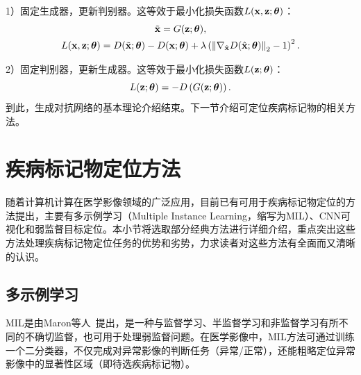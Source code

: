 1）固定生成器，更新判别器。这等效于最小化损失函数$L(\mathbf{x},\mathbf{z};\mbox{\boldmath $\theta$})$：
\begin{gather}
	\tilde{{\mathbf{x}}} = G({\mathbf{z}};\mbox{\boldmath $\theta$}), \\
	L(\mathbf{x},\mathbf{z};\mbox{\boldmath $\theta$})=D(\tilde{{\mathbf{x}}};\mbox{\boldmath $\theta$})-D({\mathbf{x}};\mbox{\boldmath $\theta$})+\lambda\left(\left\|\nabla_{\hat{\mathbf{x}}} D(\hat{\mathbf{x}};\mbox{\boldmath $\theta$})\right\|_{2}-1\right)^{2}.
\end{gather}

2）固定判别器，更新生成器。这等效于最小化损失函数$L(\mathbf{z};\mbox{\boldmath $\theta$})$：
\begin{equation}
	L(\mathbf{z};\mbox{\boldmath $\theta$})=-D\left(G(\mathbf{z};\mbox{\boldmath $\theta$})\right).
\end{equation}
\noindent 到此，生成对抗网络的基本理论介绍结束。下一节介绍可定位疾病标记物的相关方法。
\section{疾病标记物定位方法}\label{sec:related_work}
随着计算机计算在医学影像领域的广泛应用，目前已有可用于疾病标记物定位的方法提出，主要有多示例学习（Multiple Instance Learning，缩写为MIL）、CNN可视化和弱监督目标定位。本小节将选取部分经典方法进行详细介绍，重点突出这些方法处理疾病标记物定位任务的优势和劣势，力求读者对这些方法有全面而又清晰的认识。
\subsection{多示例学习}
MIL是由Maron等人~\cite{maron1998framework}提出，是一种与监督学习、半监督学习和非监督学习有所不同的不确切监督，也可用于处理弱监督问题。在医学影像中，MIL方法可通过训练一个二分类器，不仅完成对异常影像的判断任务（异常/正常），还能粗略定位异常影像中的显著性区域（即待选疾病标记物）。

